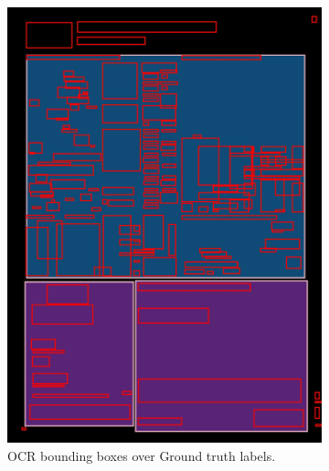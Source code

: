 \documentclass[oneside, english, bibtex]{kththesis}
\begin{document}
\begin{figure}[!htb]
\begin{adjustbox}{center,max size={\textwidth}{0.9\textheight}}
{\begin{subfigure}{0.6\textwidth}
\includegraphics[width=\linewidth]{figures/ocr_bbox/Jd55Bvg.jpg}
  \caption{OCR bounding boxes over Ground truth labels.}
  \label{fig:Jd55Bvg_GTbb}
\end{subfigure}
\begin{subfigure}{0.6\textwidth}
  \centering

\end{subfigure}}
\end{adjustbox}
\end{figure}
\end{document}
